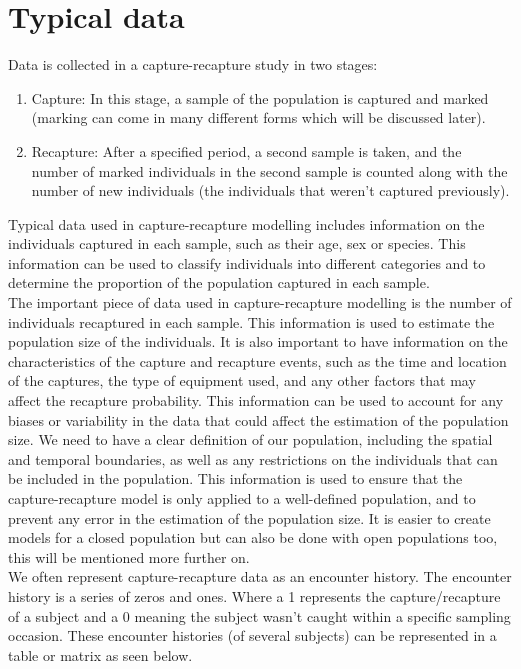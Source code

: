 \documentclass[,oneside]{article}
\numberwithin{equation}{section}
\begin{document}
\section{\large{Typical data}}
Data is collected in a capture-recapture study in two stages: 
\begin{enumerate}
\item Capture: In this stage, a sample of the population is captured and marked (marking can come in many different forms which will be discussed later). 
\item Recapture: After a specified period, a second sample is taken, and the number of marked individuals in the second sample is counted along with the number of new individuals (the individuals that weren’t captured previously).
\end{enumerate}
Typical data used in capture-recapture modelling includes information on the individuals captured in each sample, such as their age, sex or species. This information can be used to classify individuals into different categories and to determine the proportion of the population captured in each sample. \\
The important piece of data used in capture-recapture modelling is the number of individuals recaptured in each sample. This information is used to estimate the population size of the individuals. It is also important to have information on the characteristics of the capture and recapture events, such as the time and location of the captures, the type of equipment used, and any other factors that may affect the recapture probability. This information can be used to account for any biases or variability in the data that could affect the estimation of the population size.
We need to have a clear definition of our population, including the spatial and temporal boundaries, as well as any restrictions on the individuals that can be included in the population. This information is used to ensure that the capture-recapture model is only applied to a well-defined population, and to prevent any error in the estimation of the population size. It is easier to create models for a closed population but can also be done with open populations too, this will be mentioned more further on. \\
We often represent capture-recapture data as an encounter history. The encounter history is a series of zeros and ones. Where a 1 represents the capture/recapture of a subject and a 0 meaning the subject wasn’t caught within a specific sampling occasion. These encounter histories (of several subjects) can be represented in a table or matrix as seen below. \\
\end{document}
